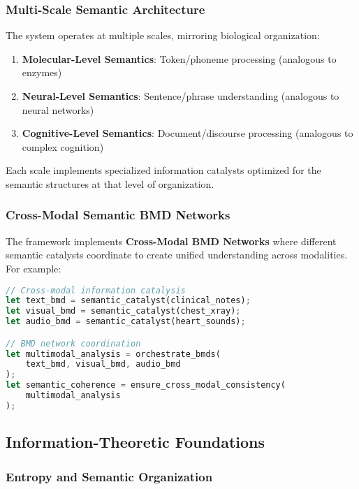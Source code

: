 \documentclass[12pt,a4paper,twoside]{article}
\begin{document}
\subsubsection{Multi-Scale Semantic Architecture}

The system operates at multiple scales, mirroring biological organization:

\begin{enumerate}
\item \textbf{Molecular-Level Semantics}: Token/phoneme processing (analogous to enzymes)
\item \textbf{Neural-Level Semantics}: Sentence/phrase understanding (analogous to neural networks)
\item \textbf{Cognitive-Level Semantics}: Document/discourse processing (analogous to complex cognition)
\end{enumerate}

Each scale implements specialized information catalysts optimized for the semantic structures at that level of organization.

\subsubsection{Cross-Modal Semantic BMD Networks}

The framework implements \textbf{Cross-Modal BMD Networks} where different semantic catalysts coordinate to create unified understanding across modalities. For example:

\begin{lstlisting}[language=rust,caption=Cross-Modal Information Catalysis]
// Cross-modal information catalysis
let text_bmd = semantic_catalyst(clinical_notes);
let visual_bmd = semantic_catalyst(chest_xray);
let audio_bmd = semantic_catalyst(heart_sounds);

// BMD network coordination
let multimodal_analysis = orchestrate_bmds(
    text_bmd, visual_bmd, audio_bmd
);
let semantic_coherence = ensure_cross_modal_consistency(
    multimodal_analysis
);
\end{lstlisting}

\subsection{Information-Theoretic Foundations}

\subsubsection{Entropy and Semantic Organization}
\end{document}

